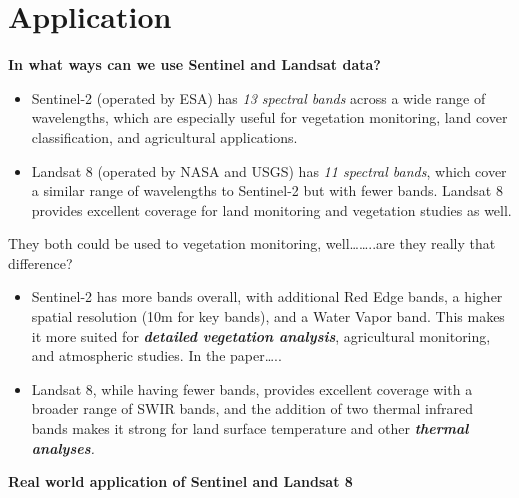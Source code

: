 \documentclass[
  letterpaper,
  DIV=11,
  numbers=noendperiod]{scrreprt}
\begin{document}
\hypertarget{application}{%
\section{Application}\label{application}}

\textbf{In what ways can we use Sentinel and Landsat data?}

\begin{itemize}
\item
  Sentinel-2 (operated by ESA) has \emph{13 spectral bands} across a
  wide range of wavelengths, which are especially useful for vegetation
  monitoring, land cover classification, and agricultural applications.
\item
  Landsat 8 (operated by NASA and USGS) has \emph{11 spectral bands},
  which cover a similar range of wavelengths to Sentinel-2 but with
  fewer bands. Landsat 8 provides excellent coverage for land monitoring
  and vegetation studies as well.
\end{itemize}

They both could be used to vegetation monitoring, well\ldots\ldots..are
they really that difference?

\begin{itemize}
\item
  Sentinel-2 has more bands overall, with additional Red Edge bands, a
  higher spatial resolution (10m for key bands), and a Water Vapor band.
  This makes it more suited for \textbf{\emph{detailed vegetation
  analysis}}, agricultural monitoring, and atmospheric studies. In the
  paper\ldots..
\item
  Landsat 8, while having fewer bands, provides excellent coverage with
  a broader range of SWIR bands, and the addition of two thermal
  infrared bands makes it strong for land surface temperature and other
  \emph{\textbf{thermal analyses}.}
\end{itemize}

\textbf{Real world application of Sentinel and Landsat 8}
\end{document}
